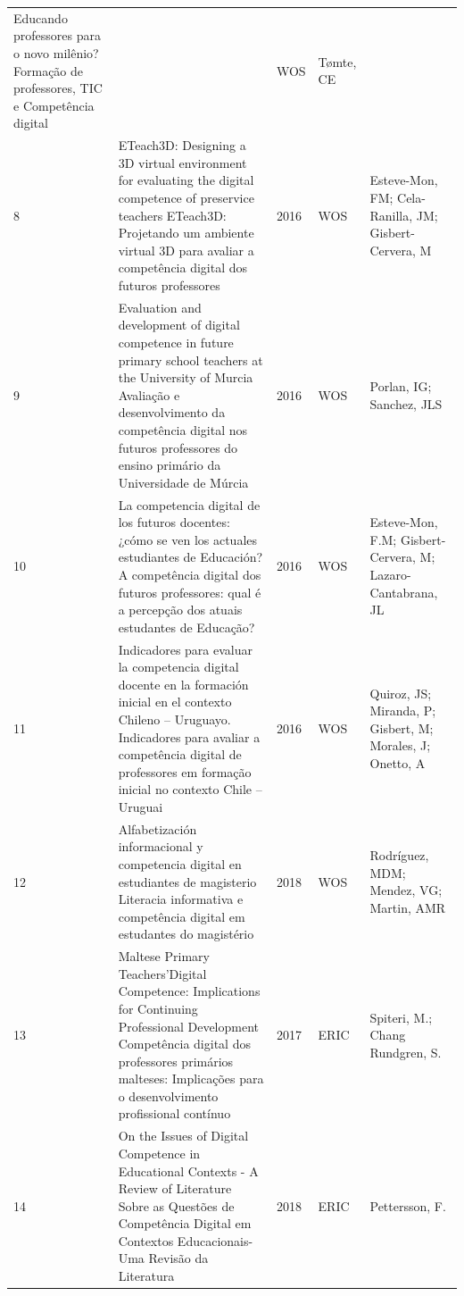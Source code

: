 \documentclass[portuguese]{textolivre}
\begin{document}
\begin{footnotesize}
\begin{longtable}{
    @{}l >{\raggedright\arraybackslash}p{}
    ll
    >{\raggedright\arraybackslash}p{}@{}
    }
Educando professores para o novo milênio? Formação de professores, TIC e Competência digital & 2015 & WOS & Tømte, CE \\
8 & ETeach3D: Designing a 3D virtual environment for evaluating the digital competence of preservice teachers \newline
ETeach3D: Projetando um ambiente virtual 3D para avaliar a competência digital dos futuros professores & 2016 & WOS & Esteve-Mon, FM; Cela-Ranilla, JM; Gisbert-Cervera, M\\
9 & Evaluation and development of digital competence in future primary school teachers at the University of Murcia \newline
Avaliação e desenvolvimento da competência digital nos futuros professores do ensino primário da Universidade de Múrcia & 2016 & WOS & Porlan, IG; Sanchez, JLS\\
10 & La competencia digital de los futuros docentes: ¿cómo se ven los actuales estudiantes de Educación? \newline
A competência digital dos futuros professores: qual é a percepção dos atuais estudantes de Educação?	& 2016 & WOS & Esteve-Mon, F.M; Gisbert-Cervera, M; Lazaro-Cantabrana, JL \\
11 & Indicadores para evaluar la competencia digital docente en la formación inicial en el contexto Chileno – Uruguayo. \newline
Indicadores para avaliar a competência digital de professores em formação inicial no contexto Chile – Uruguai & 2016 & WOS & Quiroz, JS; Miranda, P; Gisbert, M; Morales, J; Onetto, A \\
12 & Alfabetización informacional y competencia digital en estudiantes de magisterio \newline
Literacia informativa e competência digital em estudantes do magistério & 2018 & WOS & Rodríguez, MDM; Mendez, VG; Martin, AMR \\
13 & Maltese Primary Teachers'Digital Competence: Implications for Continuing Professional Development \newline
Competência digital dos professores primários malteses: Implicações para o desenvolvimento profissional contínuo & 2017 & ERIC & Spiteri, M.; Chang Rundgren, S.\\
14 & On the Issues of Digital Competence in Educational Contexts - A Review of Literature \newline
Sobre as Questões de Competência Digital em Contextos Educacionais- Uma Revisão da Literatura & 2018 & ERIC & Pettersson, F. \\

\end{longtable}
\end{footnotesize}
\end{document}
